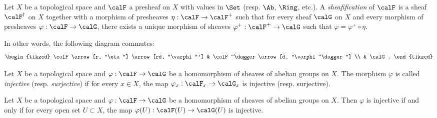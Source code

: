     \begin{definition}\label{def:sheafification_of_presheaf}
        Let \(X\) be a topological space and \(\calF\) a presheaf on \(X\) with values in \(\Set\) (resp. \(\Ab\), \(\Ring\), etc.).
        A \emph{sheafification} of \(\calF\) is a sheaf \(\calF^\dagger\) on \(X\) together with a morphism of presheaves \(\eta : \calF \to \calF^+\) such that for every sheaf \(\calG\) on \(X\) and every morphism of presheaves \(\varphi : \calF \to \calG\), 
        there exists a unique morphism of sheaves \(\varphi^+ : \calF^+ \to \calG\) such that \(\varphi = \varphi^+ \circ \eta\).
        
        In other words, the following diagram commutes:
        \[
            \begin{tikzcd}
                \calF \arrow[r, "\eta"] \arrow[rd, "\varphi"'] & \calF^\dagger \arrow[d, "\varphi^\dagger"] \\
                & \calG.
            \end{tikzcd}
        \]
    \end{definition}



    \begin{definition}\label{def:injective_and_surjective_of_homomorphism_of_sheaves}
        Let \(X\) be a topological space and \(\varphi : \calF \to \calG\) be a homomorphism of sheaves of abelian groups on \(X\).
        The morphism \(\varphi\) is called \emph{injective} (resp. \emph{surjective}) if for every \(x \in X\), the map \(\varphi_x : \calF_x \to \calG_x\) is injective (resp. surjective).
    \end{definition}

    \begin{proposition}\label{prop:injective_on_section_iff_on_stalk_sheaves}
        Let \(X\) be a topological space and \(\varphi : \calF \to \calG\) be a homomorphism of sheaves of abelian groups on \(X\).
        Then \(\varphi\) is injective if and only if for every open set \(U \subset X\), the map \(\varphi(U) : \calF(U) \to \calG(U)\) is injective.
    \end{proposition}

